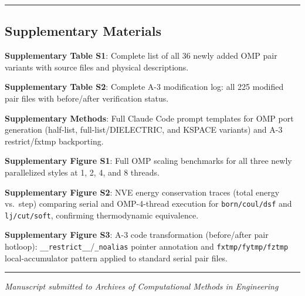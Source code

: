 \documentclass[
  11pt,
]{article}
\begin{document}
\begin{center}\rule{0.5\linewidth}{0.5pt}\end{center}

\subsection{Supplementary Materials}\label{supplementary-materials}

\textbf{Supplementary Table S1}: Complete list of all 36 newly added OMP
pair variants with source files and physical descriptions.

\textbf{Supplementary Table S2}: Complete A-3 modification log: all 225
modified pair files with before/after verification status.

\textbf{Supplementary Methods}: Full Claude Code prompt templates for
OMP port generation (half-list, full-list/DIELECTRIC, and KSPACE
variants) and A-3 restrict/fxtmp backporting.

\textbf{Supplementary Figure S1}: Full OMP scaling benchmarks for all
three newly parallelized styles at 1, 2, 4, and 8 threads.

\textbf{Supplementary Figure S2}: NVE energy conservation traces (total
energy vs.~step) comparing serial and OMP-4-thread execution for
\texttt{born/coul/dsf} and \texttt{lj/cut/soft}, confirming
thermodynamic equivalence.

\textbf{Supplementary Figure S3}: A-3 code transformation (before/after
pair hotloop): \texttt{\_\_restrict\_\_}/\texttt{\_noalias} pointer
annotation and \texttt{fxtmp/fytmp/fztmp} local-accumulator pattern
applied to standard serial pair files.

\begin{center}\rule{0.5\linewidth}{0.5pt}\end{center}

\emph{Manuscript submitted to Archives of Computational Methods in
Engineering}
\end{document}
